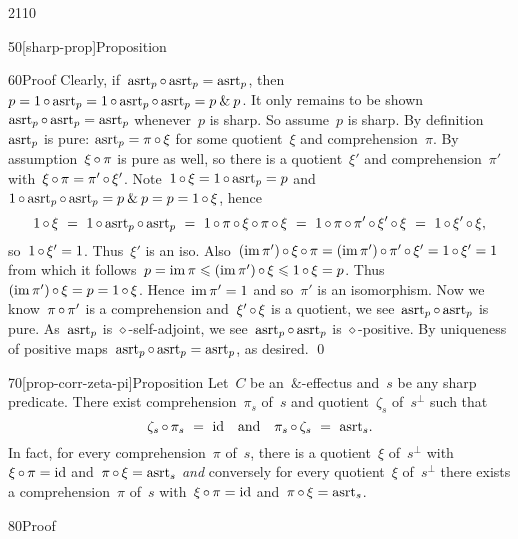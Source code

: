 \begin{parsec}{2110}
\begin{point}{50}[sharp-prop]{Proposition}
\begin{point}{60}{Proof}
Clearly, if~$\mathrm{asrt}_p \mathop{\circ} \mathrm{asrt}_p = \mathrm{asrt}_p$,
then~$p = 1 \mathop{\circ} \mathrm{asrt}_p = 1\mathop{\circ}\mathrm{asrt}_p\mathop{\circ}\mathrm{asrt}_p = p \mathbin{\&} p$.
It only remains to be shown~$\mathrm{asrt}_p \mathop{\circ} \mathrm{asrt}_p = \mathrm{asrt}_p$
    whenever~$p$ is sharp.
So assume~$p$ is sharp.
By definition~$\mathrm{asrt}_p$ is pure: $\mathrm{asrt}_p = \pi \mathop{\circ} \xi$
    for some quotient~$\xi$ and comprehension~$\pi$.
By assumption~$\xi \mathop{\circ} \pi$ is pure as well,
    so there is a quotient~$\xi'$ and comprehension~$\pi'$
    with~$\xi \mathop{\circ} \pi = \pi' \mathop{\circ} \xi'$.
Note~$1 \mathop{\circ} \xi = 1 \mathop{\circ} \mathrm{asrt}_p = p$
and~$1 \mathop{\circ} \mathrm{asrt}_p \mathop{\circ} \mathrm{asrt}_p = p \mathbin{\&} p = p = 1 \mathop{\circ} \xi$,
hence
\begin{equation*}
 1\mathop{\circ} \xi  
    \ =\  1 \mathop{\circ} \mathrm{asrt}_p \mathop{\circ} \mathrm{asrt}_p 
    \ =\  1 \mathop{\circ} \pi \mathop{\circ} \xi \mathop{\circ} \pi \mathop{\circ} \xi 
    \ =\  1 \mathop{\circ} \pi \mathop{\circ} \pi' \mathop{\circ} \xi' \mathop{\circ} \xi 
    \ =\  1 \mathop{\circ} \xi' \mathop{\circ} \xi,
\end{equation*}
so~$1 \mathop{\circ} \xi' = 1$. Thus~$\xi'$ is an iso.
Also~$
    (\operatorname{im} \pi') \mathop{\circ} \xi \mathop{\circ} \pi
    = (\operatorname{im} \pi') \mathop{\circ} \pi' \mathop{\circ} \xi'
    = 1 \mathop{\circ} \xi' = 1 $
    from which it follows~$p = \operatorname{im} \pi \leqslant  (\operatorname{im} \pi') \mathop{\circ} \xi 
            \leqslant 1 \mathop{\circ} \xi = p$.
Thus~$(\operatorname{im} \pi') \mathop{\circ} \xi = p = 1\mathop{\circ} \xi$.
Hence~$\operatorname{im} \pi' = 1$ and so~$\pi'$ is an isomorphism.
Now we know~$\pi \mathop{\circ} \pi'$
    is a comprehension and~$\xi' \mathop{\circ} \xi$ is a quotient,
    we see~$\mathrm{asrt}_p\mathop{\circ}\mathrm{asrt}_p$ is pure.
As~$\mathrm{asrt}_p$ is $\diamond$-self-adjoint,
    we see~$\mathrm{asrt}_p\mathop{\circ}\mathrm{asrt}_p$ is $\diamond$-positive.
By uniqueness of positive maps~$\mathrm{asrt}_p \mathop{\circ} \mathrm{asrt}_p = \mathrm{asrt}_p$,
    as desired. \qed
\end{point}    
\end{point}
\begin{point}{70}[prop-corr-zeta-pi]{Proposition}%
Let~$C$ be an~$\&$-effectus and~$s$
     be any sharp predicate.
There exist comprehension~$\pi_s$ of~$s$
        and quotient~$\zeta_s$ of~$s^\perp$ such that
\begin{equation*}
    \zeta_s \mathop{\circ} \pi_s \ = \ \mathrm{id} \quad \text{and} \quad
        \pi_s \mathop{\circ} \zeta_s \ = \ \mathrm{asrt}_s.
\end{equation*}
In fact, for every comprehension~$\pi$ of~$s$,
    there is a quotient~$\xi$ of~$s^\perp$
    with~$\xi \mathop{\circ} \pi = \mathrm{id}$ and~$\pi \mathop{\circ} \xi = \mathrm{asrt}_s$
    \emph{and} conversely for every quotient~$\xi$ of~$s^\perp$
    there exists a comprehension~$\pi$ of~$s$
    with~$\xi \mathop{\circ} \pi = \mathrm{id}$ and~$\pi \mathop{\circ} \xi = \mathrm{asrt}_s$.
\begin{point}{80}{Proof}%

\end{point}
\end{point}
\end{parsec}
